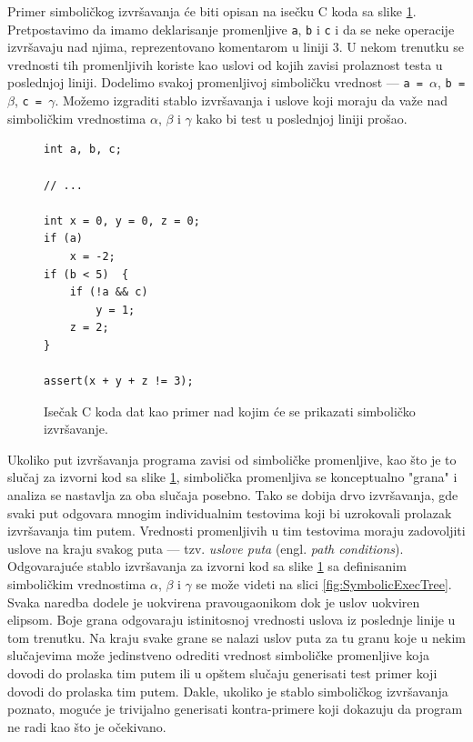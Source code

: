 Primer simboličkog izvršavanja će biti opisan na isečku C koda sa slike \ref{fig:SymbolicExecCode}. Pretpostavimo da imamo deklarisanje promenljive \texttt{a}, \texttt{b} i \texttt{c} i da se neke operacije izvršavaju nad njima, reprezentovano komentarom u liniji $3$. U nekom trenutku se vrednosti tih promenljivih koriste kao uslovi od kojih zavisi prolaznost testa u poslednjoj liniji. Dodelimo svakoj promenljivoj simboličku vrednost --- \texttt{a = }$\alpha$, \texttt{b = }$\beta$, \texttt{c = }$\gamma$. Možemo izgraditi stablo izvršavanja i uslove koji moraju da važe nad simboličkim vrednostima $\alpha$, $\beta$ i $\gamma$ kako bi test u poslednjoj liniji prošao.

\begin{figure}[h!]
\begin{lstlisting}[language={}]
int a, b, c;

// ...

int x = 0, y = 0, z = 0;
if (a)      
    x = -2;
if (b < 5)  {
    if (!a && c)    
        y = 1;
    z = 2;
}

assert(x + y + z != 3);
\end{lstlisting}
\caption{Isečak C koda dat kao primer nad kojim će se prikazati simboličko izvršavanje.}
\label{fig:SymbolicExecCode}
\end{figure}

Ukoliko put izvršavanja programa zavisi od simboličke promenljive, kao što je to slučaj za izvorni kod sa slike \ref{fig:SymbolicExecCode}, simbolička promenljiva se konceptualno "grana" i analiza se nastavlja za oba slučaja posebno. Tako se dobija drvo izvršavanja, gde svaki put odgovara mnogim individualnim testovima koji bi uzrokovali prolazak izvršavanja tim putem. Vrednosti promenljivih u tim testovima moraju zadovoljiti uslove na kraju svakog puta --- tzv. \emph{uslove puta} (engl. \emph{path conditions}). Odgovarajuće stablo izvršavanja za izvorni kod sa slike \ref{fig:SymbolicExecCode} sa definisanim simboličkim vrednostima $\alpha$, $\beta$ i $\gamma$ se može videti na slici \ref{fig:SymbolicExecTree}. Svaka naredba dodele je uokvirena pravougaonikom dok je uslov uokviren elipsom. Boje grana odgovaraju istinitosnoj vrednosti uslova iz poslednje linije u tom trenutku. Na kraju svake grane se nalazi uslov puta za tu granu koje u nekim slučajevima može jedinstveno odrediti vrednost simboličke promenljive koja dovodi do prolaska tim putem ili u opštem slučaju generisati test primer koji dovodi do prolaska tim putem. Dakle, ukoliko je stablo simboličkog izvršavanja poznato, moguće je trivijalno generisati kontra-primere koji dokazuju da program ne radi kao što je očekivano.

